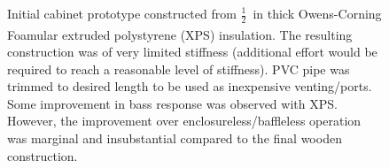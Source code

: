 \documentclass{StdTemplate} %
\begin{document}
\begin{figure}[h!]
\centering
{}
\qquad
{}
\caption{Initial cabinet prototype constructed from $\frac{1}{2}$~in thick Owens-Corning Foamular\textsuperscript{\textregistered} extruded polystyrene (XPS) insulation. The resulting construction was of very limited stiffness (additional effort would be required to reach a reasonable level of stiffness). PVC pipe was trimmed to desired length to be used as inexpensive venting/ports. Some improvement in bass response was observed with XPS. However, the improvement over enclosureless/baffleless operation was marginal and insubstantial compared to the final wooden construction.}
\label{fig:sp_xps_proto}
\end{figure}
\end{document}
